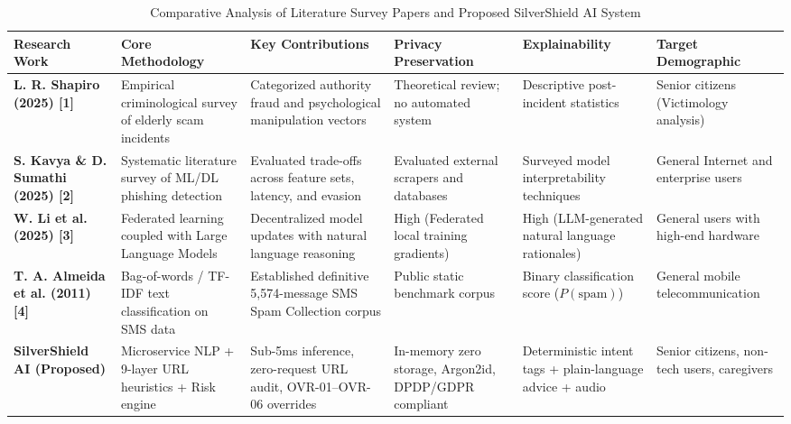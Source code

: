 \documentclass[conference]{IEEEtran}
\begin{document}
\begin{table}[!t]
\centering
\caption{Comparative Analysis of Literature Survey Papers and Proposed SilverShield AI System}
\label{tab:literature_comparison}
\begin{tabular}{|p{2.2cm}|p{2.8cm}|p{3.2cm}|p{2.3cm}|p{2.8cm}|p{2.6cm}|}
\hline
\textbf{Research Work} & \textbf{Core Methodology} & \textbf{Key Contributions} & \textbf{Privacy Preservation} & \textbf{Explainability} & \textbf{Target Demographic} \\
\hline
\textbf{L. R. Shapiro (2025) [1]} & Empirical criminological survey of elderly scam incidents & Categorized authority fraud and psychological manipulation vectors & Theoretical review; no automated system & Descriptive post-incident statistics & Senior citizens (Victimology analysis) \\
\hline
\textbf{S. Kavya \& D. Sumathi (2025) [2]} & Systematic literature survey of ML/DL phishing detection & Evaluated trade-offs across feature sets, latency, and evasion & Evaluated external scrapers and databases & Surveyed model interpretability techniques & General Internet and enterprise users \\
\hline
\textbf{W. Li et al. (2025) [3]} & Federated learning coupled with Large Language Models & Decentralized model updates with natural language reasoning & High (Federated local training gradients) & High (LLM-generated natural language rationales) & General users with high-end hardware \\
\hline
\textbf{T. A. Almeida et al. (2011) [4]} & Bag-of-words / TF-IDF text classification on SMS data & Established definitive 5,574-message SMS Spam Collection corpus & Public static benchmark corpus & Binary classification score ($P(\text{spam})$) & General mobile telecommunication \\
\hline
\textbf{SilverShield AI (Proposed)} & Microservice NLP + 9-layer URL heuristics + Risk engine & Sub-5ms inference, zero-request URL audit, OVR-01--OVR-06 overrides & In-memory zero storage, Argon2id, DPDP/GDPR compliant & Deterministic intent tags + plain-language advice + audio & Senior citizens, non-tech users, caregivers \\
\hline
\end{tabular}
\end{table}
\end{document}

